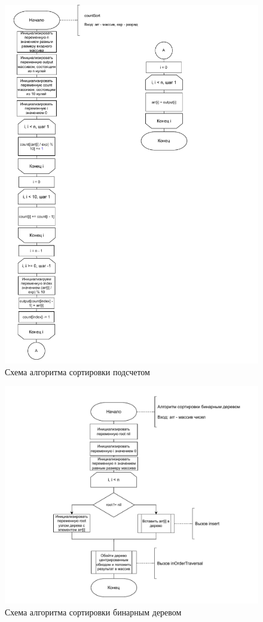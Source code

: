 \begin{figure}[h]
	\centering
	\includegraphics[width=1\linewidth]{img/countSort.pdf}
	\caption{Схема алгоритма сортировки подсчетом}
	\label{img:countSort}
\end{figure}

\begin{figure}[h]
	\centering
	\includegraphics[width=1\linewidth]{img/treeSort.pdf}
	\caption{Схема алгоритма сортировки бинарным деревом}
	\label{img:treeSort}
\end{figure}

